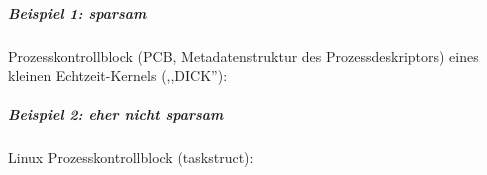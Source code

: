 \documentclass[a4paper]{article}
\begin{document}
\begin{multicols}{3}
    \subparagraph{Beispiel 1: sparsam}

    Prozesskontrollblock (PCB, Metadatenstruktur des Prozessdeskriptors)
    eines kleinen Echtzeit-Kernels (,,DICK''):



    \subparagraph{Beispiel 2: eher nicht sparsam}

    Linux Prozesskontrollblock (taskstruct):


\end{multicols}
\end{document}
